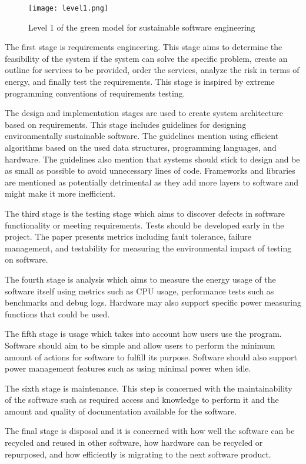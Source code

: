 \begin{figure}[H]
\caption{Level 1 of the green model for sustainable software engineering~\cite{greenmodelforsustainable}}
\label{level1}
\texttt{[image: level1.png]}
\centering
\end{figure}

The first stage is requirements engineering. This stage aims to determine the feasibility of the system if the system can solve the specific problem, create an outline for services to be provided, order the services, analyze the risk in terms of energy, and finally test the requirements. This stage is inspired by extreme programming conventions of requirements testing.

The design and implementation stages are used to create system architecture based on requirements. This stage includes guidelines for designing environmentally sustainable software. The guidelines mention using efficient algorithms based on the used data structures, programming languages, and hardware. The guidelines also mention that systems should stick to design and be as small as possible to avoid unnecessary lines of code. Frameworks and libraries are mentioned as potentially detrimental as they add more layers to software and might make it more inefficient.

The third stage is the testing stage which aims to discover defects in software functionality or meeting requirements. Tests should be developed early in the project. The paper presents metrics including fault tolerance, failure management, and testability for measuring the environmental impact of testing on software.

The fourth stage is analysis which aims to measure the energy usage of the software itself using metrics such as CPU usage, performance tests such as benchmarks and debug logs. Hardware may also support specific power measuring functions that could be used.

The fifth stage is usage which takes into account how users use the program. Software should aim to be simple and allow users to perform the minimum amount of actions for software to fulfill its purpose. Software should also support power management features such as using minimal power when idle.

The sixth stage is maintenance. This step is concerned with the maintainability of the software such as required access and knowledge to perform it and the amount and quality of documentation available for the software.

The final stage is disposal and it is concerned with how well the software can be recycled and reused in other software, how hardware can be recycled or repurposed, and how efficiently is migrating to the next software product.~\cite{greenmodelforsustainable}

